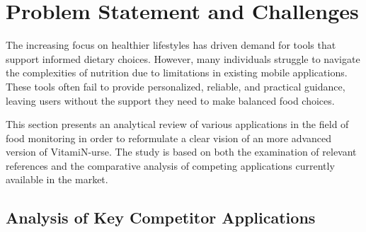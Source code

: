 \section{Problem Statement and Challenges}

The increasing focus on healthier lifestyles has driven demand for tools that support informed dietary choices. However, many individuals struggle to navigate the complexities of nutrition due to limitations in existing mobile applications. These tools often fail to provide personalized, reliable, and practical guidance, leaving users without the support they need to make balanced food choices. 
 
This section presents an analytical review of various applications in the field of food monitoring in order to reformulate a clear vision of an more advanced version of \mbox{VitamiN-urse}. The study is based on both the examination of relevant references and the comparative analysis of competing applications currently available in the market.


\newpage
\subsection{Analysis of Key Competitor Applications}
